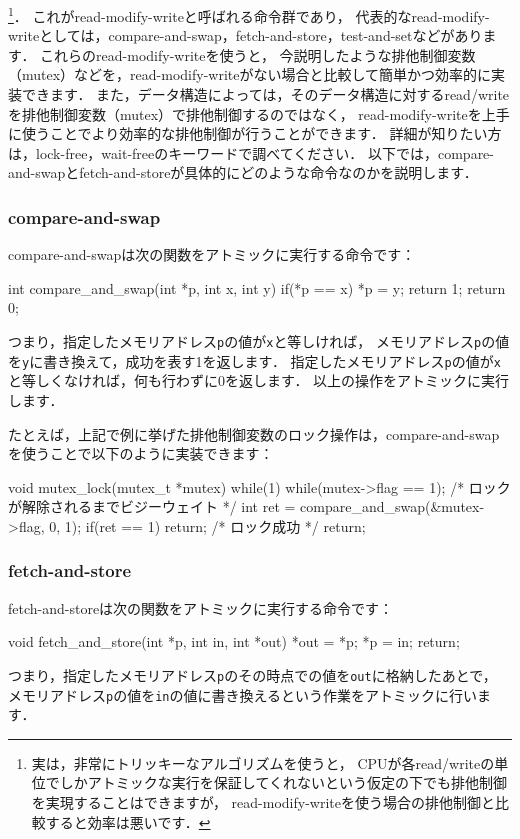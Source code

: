 \documentclass[report,12pt]{jsbook}
\begin{document}
\footnote{実は，非常にトリッキーなアルゴリズムを使うと，
CPUが各read/writeの単位でしかアトミックな実行を保証してくれないという仮定の下でも排他制御を実現することはできますが，
read-modify-writeを使う場合の排他制御と比較すると効率は悪いです．}．
これがread-modify-writeと呼ばれる命令群であり，
代表的なread-modify-writeとしては，compare-and-swap，fetch-and-store，test-and-setなどがあります．
これらのread-modify-writeを使うと，
今説明したような排他制御変数（mutex）などを，read-modify-writeがない場合と比較して簡単かつ効率的に実装できます．
また，データ構造によっては，そのデータ構造に対するread/writeを排他制御変数（mutex）で排他制御するのではなく，
read-modify-writeを上手に使うことでより効率的な排他制御が行うことができます．
詳細が知りたい方は，lock-free，wait-freeのキーワードで調べてください．
以下では，compare-and-swapとfetch-and-storeが具体的にどのような命令なのかを説明します．

\subsubsection{compare-and-swap}

compare-and-swapは次の関数をアトミックに実行する命令です：
\begin{code}
int compare_and_swap(int *p, int x, int y)
{
  if(*p == x)
    {
      *p = y;
      return 1;
    }
  return 0;
}
\end{code}
つまり，指定したメモリアドレス\texttt{p}の値が\texttt{x}と等しければ，
メモリアドレス\texttt{p}の値を\texttt{y}に書き換えて，成功を表す1を返します．
指定したメモリアドレス\texttt{p}の値が\texttt{x}と等しくなければ，何も行わずに0を返します．
以上の操作をアトミックに実行します．

たとえば，上記で例に挙げた排他制御変数のロック操作は，compare-and-swapを使うことで以下のように実装できます：
\begin{code}
void mutex_lock(mutex_t *mutex)
{
  while(1)
    {
      while(mutex->flag == 1);  /* ロックが解除されるまでビジーウェイト */
      int ret = compare_and_swap(&mutex->flag, 0, 1);
      if(ret == 1) return;  /* ロック成功 */
    }
  return;
}
\end{code}


\subsubsection{fetch-and-store}

fetch-and-storeは次の関数をアトミックに実行する命令です：
\begin{code}
void fetch_and_store(int *p, int in, int *out)
{
  *out = *p;
  *p = in;
  return;
}
\end{code}
つまり，指定したメモリアドレス\texttt{p}のその時点での値を\texttt{out}に格納したあとで，
メモリアドレス\texttt{p}の値を\texttt{in}の値に書き換えるという作業をアトミックに行います．
\end{document}
